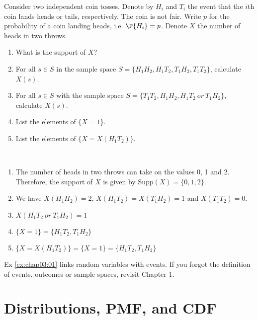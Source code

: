 \begin{exercise}\label{ex:chap03:01}
	Consider two independent coin tosses. Denote by $H_i$ and $T_i$ the event that the $i$th coin lands heads or tails, respectively. The coin is not fair. Write $p$ for the probability of a coin landing heads, i.e. $\P{H_i} = p$. Denote $X$ the number of heads in two throws.
	\begin{enumerate}
		\item What is the support of $X$?
		\item For all $s \in S$ in the sample space $S = \{H_1H_2, H_1T_2, T_1H_2, T_1T_2\}$, calculate $X(s)$.
		\item  For all $s\in S$ with the sample space $S=\{T_1T_2, H_1H_2, H_1T_2 ~\textit{or}~ T_1H_2\}$, calculate $X(s)$.
		\item List the elements of $\{X = 1\}$.
		\item List the elements of $\{X =X(H_1T_2) \}$.
	\end{enumerate}
		
	\begin{solution}~
		\begin{enumerate}
			\item The number of heads in two throws can take on the values 0, 1 and 2. Therefore, the support of $X$ is given by $\text{Supp}(X) = \{0,1,2\}$.	
			\item We have $X(H_1H_2) = 2$, $X(H_1T_2) = X(T_1H_2) = 1$ and $X(T_1T_2) = 0$.
			\item $X(H_1T_2 ~\textit{or}~ T_1H_2) = 1$
			\item $\{X = 1\} = \{H_1 T_2, T_1 H_2\}$
			\item $\{X = X(H_1 T_2)\} = \{X = 1\} = \{H_1 T_2, T_1 H_2\}$
		\end{enumerate}
	\end{solution}
\end{exercise}
	 
\begin{remark}
	Ex \ref{ex:chap03:01} links random variables with events. If you forgot the definition of events, outcomes or sample spaces, revisit Chapter 1.
\end{remark}
	
\section{Distributions, PMF, and CDF}
\label{sec:section-3.2}
	
